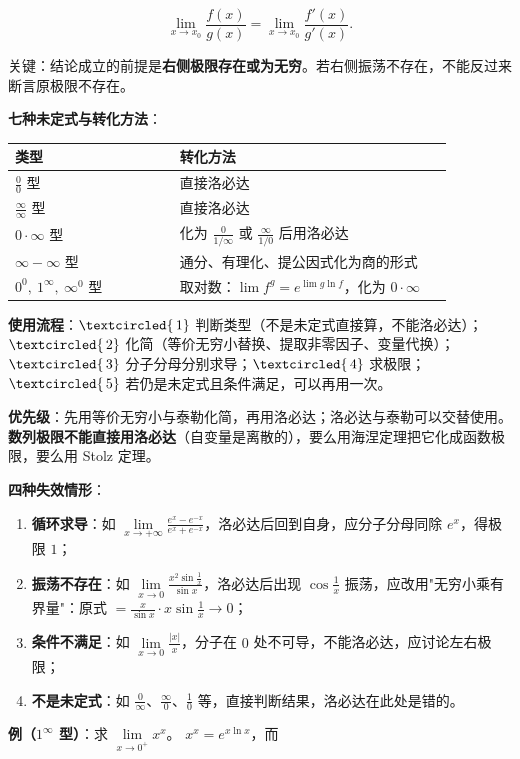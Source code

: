 \documentclass[11pt,openany,UTF8]{ctexbook}
\newcommand{\circled}[1]{\textcircled{\scriptsize\,#1}}
\begin{document}
\[\lim_{x\to x_0}\frac{f(x)}{g(x)}=\lim_{x\to x_0}\frac{f'(x)}{g'(x)}.\]

关键：结论成立的前提是\textbf{右侧极限存在或为无穷}。若右侧振荡不存在，不能反过来断言原极限不存在。

\textbf{七种未定式与转化方法}：

\begingroup\small\setlength{\tabcolsep}{4.0pt}
\begin{longtable}{@{}L{0.3565\linewidth}L{0.5891\linewidth}@{}}
\toprule
\textbf{类型} & \textbf{转化方法} \\
\midrule
\endhead
$\frac00$ 型 & 直接洛必达 \\
$\frac{\infty}{\infty}$ 型 & 直接洛必达 \\
$0\cdot\infty$ 型 & 化为 $\frac{0}{1/\infty}$ 或 $\frac{\infty}{1/0}$ 后用洛必达 \\
$\infty-\infty$ 型 & 通分、有理化、提公因式化为商的形式 \\
$0^0,\allowbreak\ 1^\infty,\allowbreak\ \infty^0$ 型 & 取对数：$\lim f^{g}=e^{\lim g\ln f}$，化为 $0\cdot\infty$ \\
\bottomrule
\end{longtable}
\endgroup

\textbf{使用流程}：$\circled{1}$ 判断类型（不是未定式直接算，不能洛必达）；$\circled{2}$ 化简（等价无穷小替换、提取非零因子、变量代换）；$\circled{3}$ 分子分母分别求导；$\circled{4}$ 求极限；$\circled{5}$ 若仍是未定式且条件满足，可以再用一次。

\textbf{优先级}：先用等价无穷小与泰勒化简，再用洛必达；洛必达与泰勒可以交替使用。\textbf{数列极限不能直接用洛必达}（自变量是离散的），要么用海涅定理把它化成函数极限，要么用 Stolz 定理。

\textbf{四种失效情形}：

\begin{enumerate}
\item \textbf{循环求导}：如 $\lim\limits_{x\to+\infty}\frac{e^x-e^{-x}}{e^x+e^{-x}}$，洛必达后回到自身，应分子分母同除 $e^x$，得极限 $1$；
\item \textbf{振荡不存在}：如 $\lim\limits_{x\to0}\frac{x^2\sin\frac1x}{\sin x}$，洛必达后出现 $\cos\frac1x$ 振荡，应改用"无穷小乘有界量"：原式 $=\frac{x}{\sin x}\cdot x\sin\frac1x\to 0$；
\item \textbf{条件不满足}：如 $\lim\limits_{x\to0}\frac{|x|}{x}$，分子在 $0$ 处不可导，不能洛必达，应讨论左右极限；
\item \textbf{不是未定式}：如 $\frac{0}{\infty}$、$\frac{\infty}{0}$、$\frac{1}{0}$ 等，直接判断结果，洛必达在此处是错的。
\end{enumerate}
\textbf{例（$1^\infty$ 型）}：求 $\lim\limits_{x\to0^+}x^x$。 $x^x=e^{x\ln x}$，而
\end{document}

